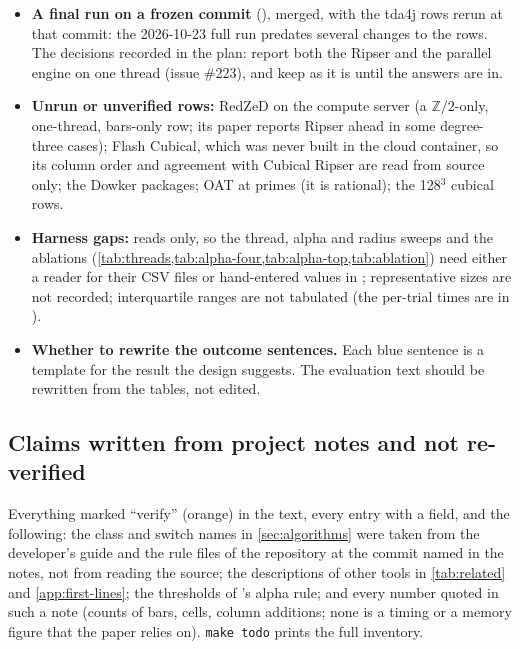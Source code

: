 \begin{itemize}[leftmargin=2em, itemsep=3pt]
\item \textbf{A final run on a frozen commit} (), merged, with the tda4j rows rerun at that commit: the 2026-10-23 full run
  predates several changes to the \tdaj{} rows. The decisions recorded in the plan: report both the Ripser and the parallel engine on one thread (issue \#223),
  and keep  as it is until the answers are in.
\item \textbf{Unrun or unverified rows:} RedZeD on the compute server (a $\mathbb{Z}/2$-only, one-thread, bars-only row; its paper reports Ripser ahead in some degree-three cases); Flash Cubical, which
  was never built in the cloud container, so its column order and agreement with Cubical Ripser are read from source only; the Dowker packages; OAT at primes (it is rational);
  the 128$^3$ cubical rows.
\item \textbf{Harness gaps:}  reads  only, so the thread, alpha and radius sweeps and the ablations
  (\cref{tab:threads,tab:alpha-four,tab:alpha-top,tab:ablation}) need either a reader for their CSV files or hand-entered values in ;
  representative sizes are not recorded; interquartile ranges are not tabulated (the per-trial times are in ).
\item \textbf{Whether to rewrite the outcome sentences.} Each blue sentence is a template for the result the design suggests. The evaluation text should be rewritten from the tables, not edited.
\end{itemize}

\subsection{Claims written from project notes and not re-verified}

Everything marked ``verify'' (orange) in the text, every  entry with a  field, and the following: the class and switch names in
\cref{sec:algorithms} were taken from the developer's guide and the rule files of the repository at the commit named in the notes, not from reading the source; the
descriptions of other tools in \cref{tab:related} and \cref{app:first-lines}; the thresholds of 's alpha rule; and every number quoted in such a note (counts of bars, cells, column additions; none is a timing or a memory figure that the paper relies on). \texttt{make todo} prints the full inventory.
\fi
